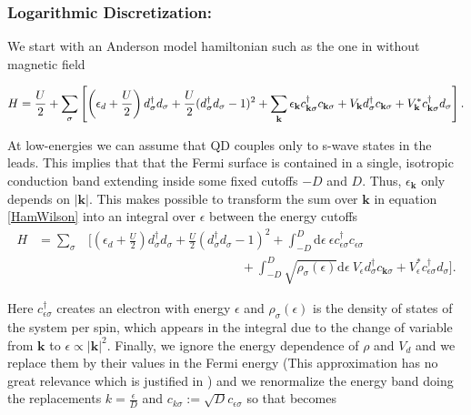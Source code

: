 \subsubsection{Logarithmic Discretization:}



We start with an Anderson model hamiltonian such as the one 
in  without magnetic field

\begin{equation}
H=\frac{U}{2}+\sum_{\sigma}\left[\left(\epsilon_{d}+\frac{U}{2}\right)d_{\sigma}^{\dagger}d_{\sigma}+\frac{U}{2}(d_{\sigma}^{\dagger}d_{\sigma}-1)^{2}+\sum_{\mathbf{k}}\epsilon_{\mathbf{k}}c_{\mathbf{k}\sigma}^{\dagger}c_{\mathbf{k}\sigma}+V_{\mathbf{k}}d_{\sigma}^{\dagger}c_{\mathbf{k}\sigma}+V_{\mathbf{k}}^{*}c_{\mathbf{k}\sigma}^{\dagger}d_{\sigma}\right].\label{HamWilson}
\end{equation}

At low-energies we can assume that QD couples only to s-wave states in the leads\citep{krishna-murthy_renormalization-group_1980}. This implies that that the Fermi surface is contained
in a single, isotropic conduction band extending inside some fixed cutoffs $-D$ and $D$. Thus, $\epsilon_{\mathbf{k}}$ only depends on $\left|\mathbf{k}\right|$. This makes possible to transform the sum over $\mathbf{k}$ in
equation \ref{HamWilson} into an integral over $\epsilon$ between
the energy cutoffs
\begin{eqnarray}
H & =\sum_{\sigma} & \Biggl[\left(\epsilon_{d}+\frac{U}{2}\right)d_{\sigma}^{\dagger}d_{\sigma}+\frac{U}{2}(d_{\sigma}^{\dagger}d_{\sigma}-1)^{2}+\int_{-D}^{D}\mbox{d}\epsilon\ \epsilon c_{\epsilon\sigma}^{\dagger}c_{\epsilon\sigma}\nonumber \\
 &  & \qquad\qquad\qquad\qquad\qquad\qquad+\int_{-D}^{D}\sqrt{\rho_{\sigma}(\epsilon)}\mbox{d}\epsilon\ V_{\epsilon}d_{\sigma}^{\dagger}c_{\mathbf{k}\sigma}+V_{\epsilon}^{*}c_{\epsilon\sigma}^{\dagger}d_{\sigma}\Biggr].\label{eq:hamEnergy}
\end{eqnarray}


Here $c_{\epsilon\sigma}^{\dagger}$ creates an electron with energy
$\epsilon$ and $\rho_{\sigma}(\epsilon)$ is the density of states
of the system per spin, which appears in the integral due to the change
of variable from $\mathbf{k}$ to $\epsilon\propto\left|\mathbf{k}\right|^{2}.$
Finally, we ignore the energy dependence of $\rho$ and $V_{d}$ and
we replace them by their values in the Fermi energy (This approximation
has no great relevance which is justified in \citep{krishna-murthy_renormalization-group_1980})
and we renormalize the energy band doing the replacements $k=\frac{\epsilon}{D}$
and $c_{k\sigma}:=\sqrt{D}c_{\epsilon\sigma}$ so that 
becomes

